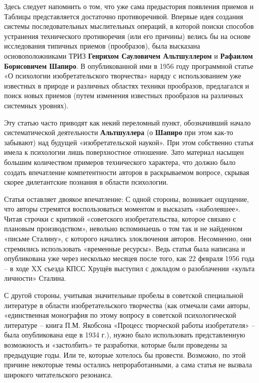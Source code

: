 \documentclass[11pt,a4paper]{article}
\begin{document}
Здесь следует напомнить о том, что уже сама предыстория появления приемов и
Таблицы представляется достаточно противоречивой. Впервые идея создания
системы последовательных мыслительных операций, в которой поиски способов
устранения технического противоречия (или его причины) велись бы на основе
исследования типичных приемов (прообразов), была высказана основоположниками
ТРИЗ \textbf{Генрихом Сауловичем Альтшуллером} и \textbf{Рафаилом Борисовичем
  Шапиро}. В опубликованной ими в 1956 году программной статье «О психологии
изобретательского творчества» \cite{Altshuller1956} наряду с использованием
уже известных в природе и различных областях техники прообразов, предлагался и
поиск новых приемов (путем изменения известных прообразов на различных
системных уровнях).

Эту статью часто приводят как некий переломный пункт, обозначивший начало
систематической деятельности \textbf{Альтшуллера} (о \textbf{Шапиро} при этом
как-то забывают) над будущей «изобретательской наукой». При этом собственно
статья имела к психологии лишь поверхностное отношение. Зато материал насыщен
большим количеством примеров технического характера, что должно было создать
впечатление компетентности авторов в раскрываемом вопросе, скрывая скорее
дилетантские познания в области психологии.

Статья оставляет двоякое впечатление: С одной стороны, возникает ощущение, что
авторы стремятся воспользоваться моментом и высказать «наболевшее». Читая
строчки с критикой «советского изобретательства, которое связано с плановым
производством», невольно вспоминаешь о том так и не найденном «письме
Сталину», с которого начались злоключения авторов. Несомненно, они стремились
использовать «временные ресурсы». Ведь статья была написана и опубликована уже
через несколько месяцев после того, как 22 февраля 1956 года -- в ходе XX
съезда КПСС Хрущёв выступил с докладом о разоблачении «культа личности»
Сталина.

С другой стороны, учитывая значительные пробелы в советской специальной
литературе в области изобретательского творчества (как отмечали сами авторы,
«единственная монография по этому вопросу в советской психологической
литературе -- книга П.М. Якобсона «Процесс творческой работы изобретателя» --
была опубликована еще в 1934 г.), нужно было использовать представленную
возможность и «застолбить» те разработки, которые были проведены за предыдущие
годы. Или те, которые хотелось бы провести. Возможно, по этой причине
некоторые темы остались непроработанными, а сама статья не вызвала широкого
читательского резонанса.
\end{document}
